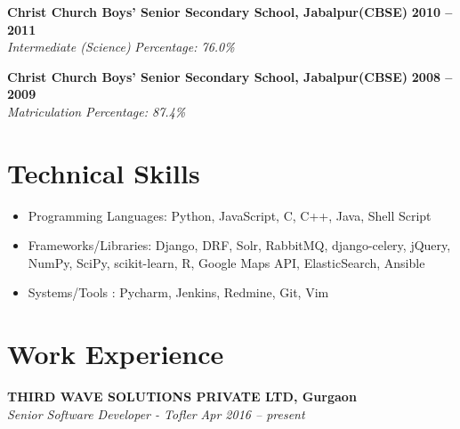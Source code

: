 \documentclass[margin,line]{resume}
\begin{document}
\begin{resume}
    \textbf{Christ Church Boys' Senior Secondary School, Jabalpur(CBSE)} \hfill \textbf{2010 -- 2011}\vspace{0mm}\\\vspace{0mm}%
    \textsl{Intermediate (Science)} \hfill \textsl{Percentage: 76.0\%}

    \textbf{Christ Church Boys' Senior Secondary School, Jabalpur(CBSE)} \hfill \textbf{2008 -- 2009}\vspace{0mm}\\\vspace{0mm}%
    \textsl{Matriculation } \hfill \textsl{Percentage: 87.4\%}
    \section{\mysidestyle Technical Skills}
     \begin{itemize}
      \item Programming Languages: Python, JavaScript, C, C++, Java, Shell Script
      \item Frameworks/Libraries: Django, DRF, Solr, RabbitMQ, django-celery, jQuery, NumPy, SciPy, scikit-learn, R, Google Maps API, ElasticSearch, Ansible
      \item Systems/Tools : Pycharm, Jenkins, Redmine, Git, Vim
     \end{itemize}
    \section{\mysidestyle Work Experience}


    \textbf{THIRD WAVE SOLUTIONS PRIVATE LTD, Gurgaon}\\
           \textsl{Senior Software Developer - Tofler} \hfill \textsl{Apr 2016 -- present} \vspace{0mm}\\\vspace{0mm}%
    \begin{itemize}
    

\end{itemize}
\end{resume}
\end{document}
